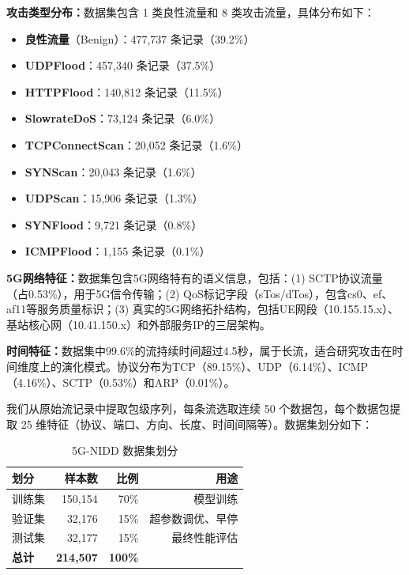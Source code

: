 \textbf{攻击类型分布：}数据集包含 1 类良性流量和 8 类攻击流量，具体分布如下：

\begin{itemize}
  \item \textbf{良性流量}（Benign）：477,737 条记录（39.2\%）
  \item \textbf{UDPFlood}：457,340 条记录（37.5\%）
  \item \textbf{HTTPFlood}：140,812 条记录（11.5\%）
  \item \textbf{SlowrateDoS}：73,124 条记录（6.0\%）
  \item \textbf{TCPConnectScan}：20,052 条记录（1.6\%）
  \item \textbf{SYNScan}：20,043 条记录（1.6\%）
  \item \textbf{UDPScan}：15,906 条记录（1.3\%）
  \item \textbf{SYNFlood}：9,721 条记录（0.8\%）
  \item \textbf{ICMPFlood}：1,155 条记录（0.1\%）
\end{itemize}

\textbf{5G网络特征：}数据集包含5G网络特有的语义信息，包括：(1) SCTP协议流量（占0.53\%），用于5G信令传输；(2) QoS标记字段（sTos/dTos），包含cs0、ef、af11等服务质量标识；(3) 真实的5G网络拓扑结构，包括UE网段（10.155.15.x）、基站核心网（10.41.150.x）和外部服务IP的三层架构。

\textbf{时间特征：}数据集中99.6\%的流持续时间超过4.5秒，属于长流，适合研究攻击在时间维度上的演化模式。协议分布为TCP（89.15\%）、UDP（6.14\%）、ICMP（4.16\%）、SCTP（0.53\%）和ARP（0.01\%）。

我们从原始流记录中提取包级序列，每条流选取连续 50 个数据包，每个数据包提取 25 维特征（协议、端口、方向、长度、时间间隔等）。数据集划分如下：

\begin{table}[h]
\centering
\begin{tabular}{lrrr}
\hline
\textbf{划分} & \textbf{样本数} & \textbf{比例} & \textbf{用途} \\
\hline
训练集 & 150,154 & 70\% & 模型训练 \\
验证集 & 32,176 & 15\% & 超参数调优、早停 \\
测试集 & 32,177 & 15\% & 最终性能评估 \\
\hline
\textbf{总计} & \textbf{214,507} & \textbf{100\%} & \\
\hline
\end{tabular}
\caption{5G-NIDD 数据集划分}
\end{table}

